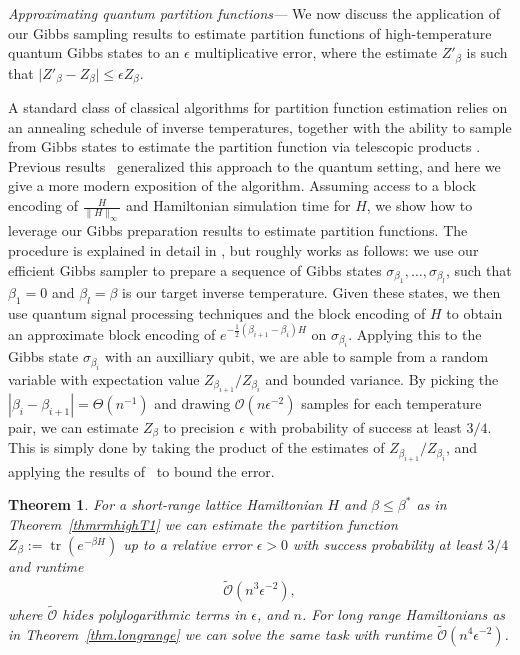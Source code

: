 \documentclass[aps,pra,amsmath,amssymb,twocolumn,10pt]{revtex4-2}
\newtheorem{thm}{Theorem}
\theoremstyle{definition}
\def\lb{\left(}
\def\rb{\right)}
\newcommand{\tr}[1]{\operatorname{tr}\lb#1\rb}
\begin{document}
\emph{Approximating quantum partition functions—}
We now discuss the application of our Gibbs sampling results to estimate partition functions of high-temperature quantum Gibbs states to an $\epsilon$ multiplicative error, where the estimate $Z'_\beta$ is such that
$\vert Z'_\beta - Z_\beta \vert \le  \epsilon Z_\beta$.

A standard class of classical algorithms for partition function estimation relies on an annealing schedule of inverse temperatures, together with the ability to sample from Gibbs states to estimate the partition function via telescopic products \cite{Stefankovic2007,pmlr-v75-kolmogorov18a,Huber2015,Bezkov2008}. Previous results~\cite{Wocjan2008,poulin_sampling_2009,Montanaro2015,hamoudi_magniez,Harrow2020,Arunachalam2022,Cornelissen2023} generalized this approach to the quantum setting, and here we give a more modern exposition of the algorithm. Assuming access to a block encoding of $\frac{H}{\|H\|_\infty}$ and Hamiltonian simulation time for $H$, we show how to leverage our Gibbs preparation results to estimate partition functions.
The procedure is explained in detail in \cite{supplemental}, but roughly works as follows: we use our efficient Gibbs sampler to prepare a sequence of Gibbs states $\sigma_{\beta_1},\ldots,\sigma_{\beta_l}$, such that $\beta_1=0$ and $\beta_l=\beta$ is our target inverse temperature. Given these states, we then use quantum signal processing techniques and the block encoding of $H$ to obtain an approximate block encoding of $e^{-\tfrac{1}{2}(\beta_{i+1}-\beta_i)H}$ on $\sigma_{\beta_i}$. Applying this to the Gibbs state $\sigma_{\beta_i}$ with an auxilliary qubit, we are able to sample from a random variable with expectation value $Z_{\beta_{i+1}}/Z_{\beta_{i}}$ and bounded variance.
By picking the $|\beta_i-\beta_{i+1}|=\Theta(n^{-1})$ and drawing $\mathcal{O}(n\epsilon^{-2})$ samples for each temperature pair, we can estimate $Z_\beta$ to precision $\epsilon$ with probability of success at least $3/4$. This is simply done by taking the product of the estimates of $Z_{\beta_{i+1}}/Z_{\beta_{i}}$, and applying the results of~\cite{dyer1991computing} to bound the error. 
\begin{thm}
For a short-range lattice Hamiltonian $H$ and $\beta\leq\beta^*$ as in Theorem~\ref{thmrmhighT1} we can estimate the partition function $Z_{\beta}:=\tr{e^{-\beta H}}$ up to a relative error $\epsilon>0$ with success probability at least $3/4$ and runtime
\begin{align}
\widetilde{\mathcal{O}}(n^3\epsilon^{-2}),
\end{align}
where $\widetilde{\mathcal{O}}$ hides polylogarithmic terms in $\epsilon$, and $n$. For long range Hamiltonians as in Theorem~\ref{thm.longrange} we can solve the same task with runtime $\widetilde{\mathcal{O}}(n^4\epsilon^{-2})$.%
\end{thm}
\end{document}
